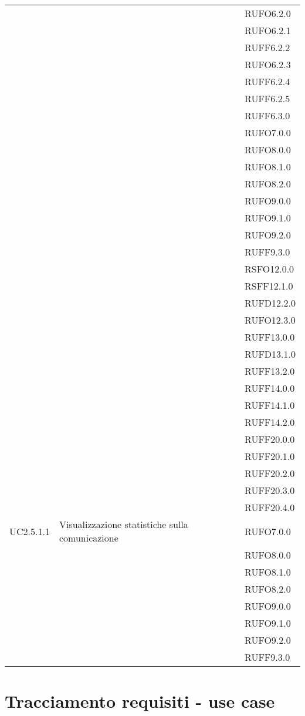 \begin{center}
\begin{longtable}{lp{}l}
 &  & RUFO6.2.0 \\
 &  & RUFO6.2.1 \\
 &  & RUFF6.2.2 \\
 &  & RUFO6.2.3 \\
 &  & RUFF6.2.4 \\
 &  & RUFF6.2.5 \\
 &  & RUFF6.3.0 \\
 &  & RUFO7.0.0 \\
 &  & RUFO8.0.0 \\
 &  & RUFO8.1.0 \\
 &  & RUFO8.2.0 \\
 &  & RUFO9.0.0 \\
 &  & RUFO9.1.0 \\
 &  & RUFO9.2.0 \\
 &  & RUFF9.3.0 \\
 &  & RSFO12.0.0 \\
 &  & RSFF12.1.0 \\
 &  & RUFD12.2.0 \\
 &  & RUFO12.3.0 \\
 &  & RUFF13.0.0 \\
 &  & RUFD13.1.0 \\
 &  & RUFF13.2.0 \\
 &  & RUFF14.0.0 \\
 &  & RUFF14.1.0 \\
 &  & RUFF14.2.0 \\
 &  & RUFF20.0.0 \\
 &  & RUFF20.1.0 \\
 &  & RUFF20.2.0 \\
 &  & RUFF20.3.0 \\
 &  & RUFF20.4.0 \\
UC2.5.1.1 & Visualizzazione statistiche sulla comunicazione & RUFO7.0.0 \\
 &  & RUFO8.0.0 \\
 &  & RUFO8.1.0 \\
 &  & RUFO8.2.0 \\
 &  & RUFO9.0.0 \\
 &  & RUFO9.1.0 \\
 &  & RUFO9.2.0 \\
 &  & RUFF9.3.0 \\
\bottomrule
\end{longtable}
\end{center}
\newpage\section{Tracciamento requisiti - use case}\label{sec:tracciamento}

